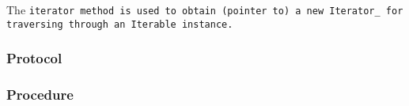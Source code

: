 \def\Subsubsection#1{\subsubsection{#1}
}

The \tt{iterator} method is used to obtain (pointer to) a new
\tt{Iterator_} for traversing through an \tt{Iterable} instance.

\Subsubsection{Protocol}

\Subsubsection{Procedure}
